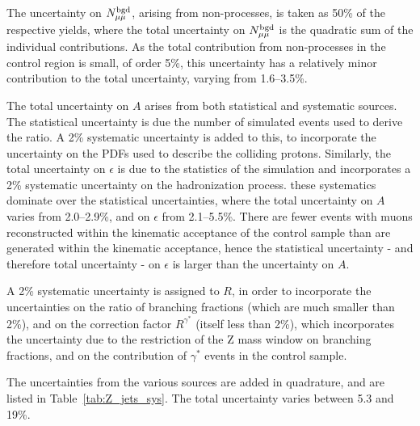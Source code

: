 The uncertainty on $N^{\rm bgd}_{\mu\mu}$, arising from non-\zmumubr processes, is taken as 
50\% of the respective yields, where the total uncertainty on $N^{\rm bgd}_{\mu\mu}$ is the quadratic sum of the individual contributions. 
As the total contribution from non-\zmumubr processes in the control region is small, of order 5\%, this uncertainty has a relatively minor contribution to the total uncertainty, varying from 1.6--3.5\%.

The total uncertainty on $A$ arises from both statistical and systematic sources. 
The statistical uncertainty is due the number of simulated events used to derive the ratio. 
A 2\% systematic uncertainty is added to this, 
to incorporate the uncertainty on the \ac{PDFs} used to describe the colliding protons.
Similarly, the total uncertainty on $\epsilon$ is due to the statistics of the simulation and incorporates a 2\% systematic uncertainty on the hadronization process. 
these systematics dominate over the statistical uncertainties, where the total uncertainty on $A$ varies from 2.0--2.9\%, and on $\epsilon$ from 2.1--5.5\%. 
There are fewer events with muons reconstructed within the kinematic acceptance of the control sample than are generated within the kinematic acceptance, hence the statistical uncertainty - and therefore total uncertainty - on $\epsilon$ is larger than the uncertainty on $A$.

A 2\% systematic uncertainty is assigned to $R$, in order to incorporate the uncertainties on the 
ratio of branching fractions (which are much smaller than 2\%), 
and on the correction factor $R^{\gamma^{*}}$ (itself less than 2\%), which incorporates 
the uncertainty due to the restriction of the Z mass window on branching fractions,
and on the contribution of $\gamma^{*}$ events in the control sample.

The uncertainties from the various sources are added in quadrature, and are listed in Table~\ref{tab:Z_jets_sys}. 
The total uncertainty varies between 5.3 and 19\%. 

